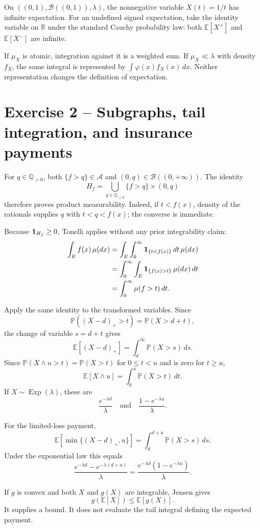 On $((0,1),\mathcal B((0,1)),\lambda)$, the nonnegative variable $X(t)=1/t$ has infinite expectation. For an undefined signed expectation, take the identity variable on $\mathbb R$ under the standard Cauchy probability law: both $\mathbb E[X^+]$ and $\mathbb E[X^-]$ are infinite.

If $\mu_X$ is atomic, integration against it is a weighted sum. If $\mu_X\ll\lambda$ with density $f_X$, the same integral is represented by $\int\varphi(x)f_X(x)\,dx$. Neither representation changes the definition of expectation.

\section*{Exercise 2 -- Subgraphs, tail integration, and insurance payments}

For $q\in\mathbb Q_{>0}$, both $\{f>q\}\in\mathcal A$ and $(0,q)\in\mathcal B((0,+\infty))$. The identity
\[
H_f
=
\bigcup_{q\in\mathbb Q_{>0}}
\{f>q\}\times(0,q)
\]
therefore proves product measurability. Indeed, if $t<f(x)$, density of the rationals supplies $q$ with $t<q<f(x)$; the converse is immediate.

Because $\mathbf 1_{H_f}\ge0$, Tonelli applies without any prior integrability claim:
\[
\begin{aligned}
\int_Ef(x)\,\mu(dx)
&=
\int_E\int_0^\infty\mathbf 1_{\{t<f(x)\}}\,dt\,\mu(dx)\\
&=
\int_0^\infty\int_E\mathbf 1_{\{f(x)>t\}}\,\mu(dx)\,dt\\
&=
\int_0^\infty\mu(f>t)\,dt.
\end{aligned}
\]

Apply the same identity to the transformed variables. Since
\[
\mathbb P((X-d)_+>t)=\mathbb P(X>d+t),
\]
the change of variable $s=d+t$ gives
\[
\mathbb E[(X-d)_+]
=
\int_d^\infty\mathbb P(X>s)\,ds.
\]
Since $\mathbb P(X\wedge u>t)=\mathbb P(X>t)$ for $0\le t<u$ and is zero for $t\ge u$,
\[
\mathbb E[X\wedge u]
=
\int_0^u\mathbb P(X>t)\,dt.
\]
If $X\sim\operatorname{Exp}(\lambda)$, these are
\[
\frac{e^{-\lambda d}}{\lambda}
\quad\text{and}\quad
\frac{1-e^{-\lambda u}}{\lambda}.
\]

For the limited-loss payment,
\[
\mathbb E[\min\{(X-d)_+,u\}]
=
\int_d^{d+u}\mathbb P(X>s)\,ds.
\]
Under the exponential law this equals
\[
\frac{e^{-\lambda d}-e^{-\lambda(d+u)}}{\lambda}
=
\frac{e^{-\lambda d}(1-e^{-\lambda u})}{\lambda}.
\]

If $g$ is convex and both $X$ and $g(X)$ are integrable, Jensen gives
\[
g(\mathbb E[X])\le\mathbb E[g(X)].
\]
It supplies a bound. It does not evaluate the tail integral defining the expected payment.


